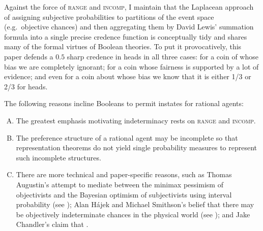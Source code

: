 \documentclass[11pt]{article}
\begin{document}

Against the force of \textsc{range} and \textsc{incomp}, I maintain
that the Laplacean approach of assigning subjective probabilities to
partitions of the event space (e.g.\ objective chances) and then
aggregating them by David Lewis' summation formula into a single
precise credence function is conceptually tidy and shares many of the
formal virtues of Boolean theories. To put it provocatively, this
paper defends a $0.5$ sharp credence in heads in all three cases: for
a coin of whose bias we are completely ignorant; for a coin whose
fairness is supported by a lot of evidence; and even for a coin about
whose bias we know that it is either 1/3 or 2/3 for heads. 

The following reasons incline Booleans to permit instates for rational
agents:

\begin{enumerate}[(A)]
\item The greatest emphasis motivating indeterminacy rests on
  \textsc{range} and \textsc{incomp}.
\item The preference structure of a rational agent may be incomplete
  so that representation theorems do not yield single probability
  measures to represent such incomplete structures.
\item There are more technical and paper-specific reasons, such as
  Thomas Augustin's attempt to mediate between the minimax pessimism
  of objectivists and the Bayesian optimism of subjectivists using
  interval probability (see ); Alan
  H{\'a}jek and Michael Smithson's belief that there may be
  objectively indeterminate chances in the physical world (see
  ); and Jake Chandler's claim that
   .
\end{enumerate}
\end{document}
